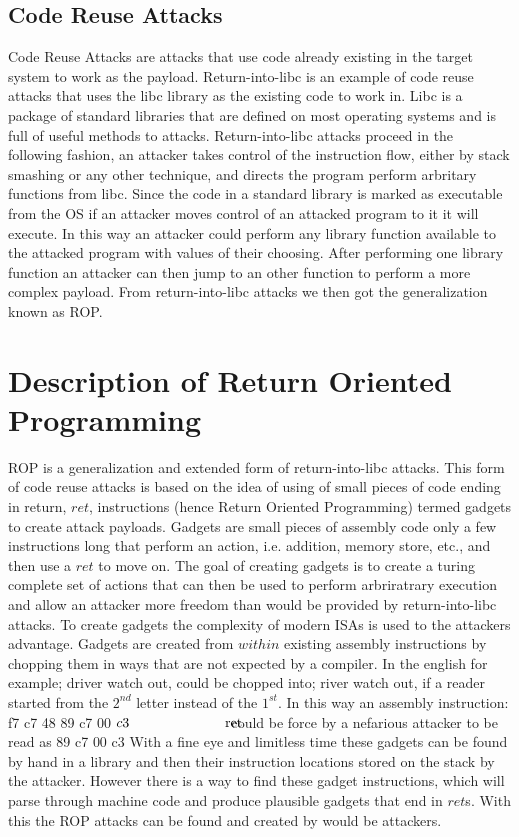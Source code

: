 \documentclass[11pt]{amsart}
\newcommand{\tab}[1]{\hspace{.2\textwidth}\rlap{#1}}
\begin{document}
\subsection*{Code Reuse Attacks}
Code Reuse Attacks are attacks that use code already existing in the target system to work as the payload. Return-into-libc is an example of code reuse attacks that uses the libc library as the existing code to work in. Libc is a package of standard libraries that are defined on most operating systems and is full of useful methods to attacks. Return-into-libc attacks proceed in the following fashion, an attacker takes control of the instruction flow, either by stack smashing or any other technique, and directs the program perform arbritary functions from libc. Since the code in a standard library is marked as executable from the OS if an attacker moves control of an attacked program to it it will execute. In this way an attacker could perform any library function available to the attacked program with values of their choosing. After performing one library function an attacker can then jump to an other function to perform a more complex payload.  From return-into-libc attacks we then got the generalization known as ROP.
\section*{Description of Return Oriented Programming}
ROP is a generalization and extended form of return-into-libc attacks. This form of code reuse attacks is based on the idea of using of small pieces of code ending in return, $ret$, instructions (hence Return Oriented Programming) termed gadgets to create attack payloads. Gadgets are small pieces of assembly code only a few instructions long that perform an action, i.e. addition, memory store, etc., and then use a $ret$ to move on. The goal of creating gadgets is to create a turing complete set of actions that can then be used to perform arbriratrary execution and allow an attacker more freedom than would be provided by return-into-libc attacks. \newline
To create gadgets the complexity of modern ISAs is used to the attackers advantage.  Gadgets are created from $within$ existing assembly instructions by chopping them in ways that are not expected by a compiler.  In the english for example; driver watch out, could be chopped into; river watch out, if a reader started from the $2^{nd}$ letter instead of the $1^{st}$.  In this way an assembly instruction: \newline f7 c7 48 89 c7 00 \tab{test \$0x00c78948, \%edi} \newline$c3\tab{ret}$ \newline could be force by a nefarious attacker to be read as  89 c7 \tab{mov \%rax,\%rdi} \newline$00$ \newline c3 \tab{ret} \newline
With a fine eye and limitless time these gadgets can be found by hand in a library and then their instruction locations stored on the stack by the attacker.  However there is a way to find these gadget instructions, which will parse through machine code and produce plausible gadgets that end in $ret$s.  With this the ROP attacks can be found and created by would be attackers.
\end{document}
